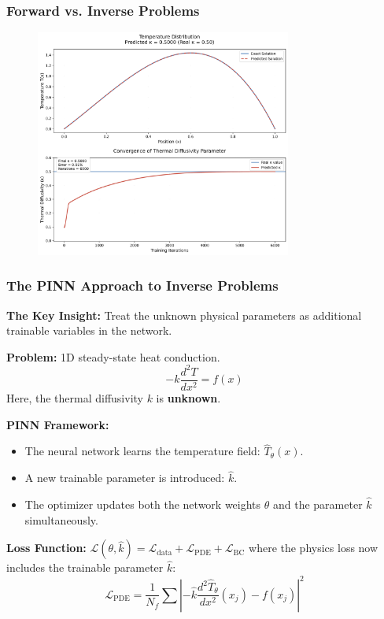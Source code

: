\documentclass[notes]{beamer}
\begin{document}
\begin{frame}
	\frametitle{Forward vs. Inverse Problems}
	
	\begin{figure}[ht]
		\centering
		\includegraphics[width=0.75\textwidth]{figs/inverse-heat-diffusivity.png}
	\end{figure}
	
\end{frame}

\begin{frame}
\frametitle{The PINN Approach to Inverse Problems}

\textbf{The Key Insight:} Treat the unknown physical parameters as additional trainable variables in the network.

\textbf{Problem:} 1D steady-state heat conduction.
\begin{equation*}
-k \frac{d^2T}{dx^2} = f(x)
\end{equation*}
Here, the thermal diffusivity $k$ is \textbf{unknown}.

\textbf{PINN Framework:}
\begin{itemize}
    \item The neural network learns the temperature field: $\hat{T}_\theta(x)$.
    \item A new trainable parameter is introduced: $\hat{k}$.
    \item The optimizer updates both the network weights $\theta$ and the parameter $\hat{k}$ simultaneously.
\end{itemize}

\textbf{Loss Function:} $\mathcal{L}(\theta, \hat{k}) = \mathcal{L}_{\text{data}} + \mathcal{L}_{\text{PDE}} + \mathcal{L}_{\text{BC}}$
where the physics loss now includes the trainable parameter $\hat{k}$:
\begin{equation*}
\mathcal{L}_{\text{PDE}} = \frac{1}{N_f}\sum \left|-\hat{k}\frac{d^2\hat{T}_\theta}{dx^2}(x_j) - f(x_j)\right|^2
\end{equation*}

\end{frame}
\end{document}
